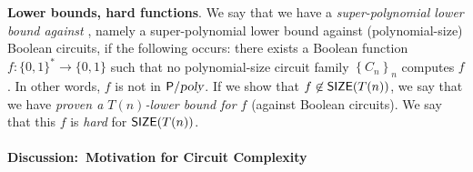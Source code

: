 \begin{tcolorbox}[colframe=white, colback=green!5, boxrule=0mm, sharp corners]
\textbf{Lower bounds, hard functions}.
We say that we have a \textit{super-polynomial lower bound against \Ppoly}, namely a super-polynomial lower bound against (polynomial-size) Boolean circuits, if the following occurs: there exists a Boolean function $f:\{0,1\}^*\to \{0,1\}$ such that no polynomial-size circuit family $\left\{C_n\right\}_n$ computes $f$. In other words, $f$ is not in ${\mathsf{P}}/{\textsl{poly}}$. If we show that $f\not\in\operatorname{{\mathsf{SIZE}}}(T(n))$, we say that we have \textit{proven a $T(n)$-lower bound for $f$} (against Boolean circuits). We say that this $f$ is \emph{hard} for $\operatorname{{\mathsf{SIZE}}}(T(n))$.
\end{tcolorbox}



\paragraph{Discussion:\ Motivation for Circuit Complexity}

